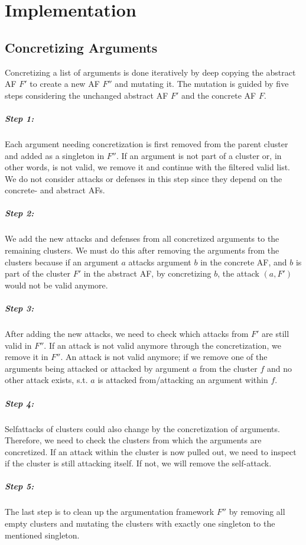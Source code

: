 \chapter{Implementation}

\section{Concretizing Arguments}
Concretizing a list of arguments is done iteratively by deep copying the abstract AF $F'$ to create a new AF $F''$ and mutating it. The mutation is guided by five steps considering the unchanged abstract AF $F'$ and the concrete AF $F$. 

\paragraph{Step 1:} Each argument needing concretization is first removed from the parent cluster and added as a singleton in $F''$. 
If an argument is not part of a cluster or, in other words, is not valid, we remove it and continue with the filtered valid list.
We do not consider attacks or defenses in this step since they depend on the concrete- and abstract AFs.

\paragraph{Step 2:} We add the new attacks and defenses from all concretized arguments to the remaining clusters. We must do this after
removing the arguments from the clusters because if an argument $a$ attacks argument $b$ in the concrete AF, and $b$ is part of the cluster $F'$ in the abstract AF,
by concretizing $b$, the attack $(a,F')$ would not be valid anymore.

\paragraph{Step 3:} After adding the new attacks, we need to check which attacks from $F'$ are still valid in $F''$. If an attack is not valid
anymore through the concretization, we remove it in $F''$. An attack is not valid anymore; if we remove one of the arguments being attacked or attacked by argument $a$ from the cluster $f$ and no other attack exists, s.t. $a$ is attacked from/attacking an argument within $f$.

\paragraph{Step 4:} Selfattacks of clusters could also change by the concretization of arguments. Therefore, we need to check the clusters from 
which the arguments are concretized. If an attack within the cluster is now pulled out, we need to inspect if the cluster is still attacking itself.
If not, we will remove the self-attack.

\paragraph{Step 5:} The last step is to clean up the argumentation framework $F''$ by removing all empty clusters and mutating the clusters with exactly
one singleton to the mentioned singleton. 



